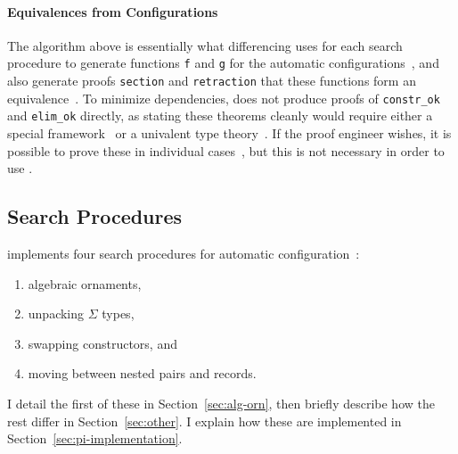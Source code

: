 \paragraph{Equivalences from Configurations}
The algorithm above is essentially what differencing uses for each search procedure to generate functions \lstinline{f} and \lstinline{g} for the automatic configurations~\href{https://github.com/uwplse/pumpkin-pi/blob/v2.0.0/plugin/src/automation/search/search.ml}{}, %
and also generate proofs \lstinline{section} and \lstinline{retraction} that these functions form an equivalence~\href{https://github.com/uwplse/pumpkin-pi/blob/v2.0.0/plugin/src/automation/search/equivalence.ml}{}. %
To minimize dependencies, \toolnamec does not produce proofs of \lstinline{constr_ok} and \lstinline{elim_ok} directly,
as stating these theorems cleanly would require either a special framework~\cite{tabareau2017equivalences}
or a univalent type theory~\cite{univalent2013homotopy}.
If the proof engineer wishes, it is possible to prove these in individual cases~\href{https://github.com/uwplse/pumpkin-pi/blob/v2.0.0/plugin/coq/playground/arbitrary.v}{}, %
but this is not necessary in order to use \toolnamec. %

\subsection{Search Procedures}
\label{sec:proc}

\toolnamec implements four search procedures for automatic configuration~\href{https://github.com/uwplse/pumpkin-pi/blob/v2.0.0/plugin/src/automation/lift/liftconfig.ml}{}:

\begin{enumerate}
\item algebraic ornaments,
\item unpacking $\Sigma$ types,
\item swapping constructors, and
\item moving between nested pairs and records.
\end{enumerate}
I detail the first of these in Section~\ref{sec:alg-orn},
then briefly describe how the rest differ in Section~\ref{sec:other}.
I explain how these are implemented in Section~\ref{sec:pi-implementation}.


